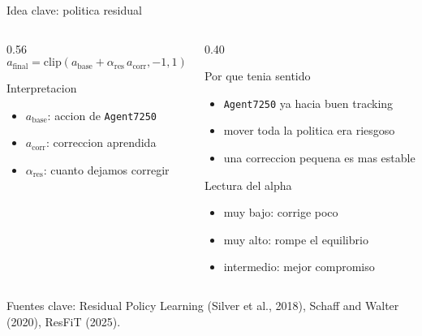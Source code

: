 \documentclass[aspectratio=169,11pt]{beamer}
\begin{document}
\begin{frame}{Idea clave: politica residual}
\begin{columns}[T]
\begin{column}{0.56\linewidth}
\[
a_{\mathrm{final}} = \mathrm{clip}\left(a_{\mathrm{base}} + \alpha_{\mathrm{res}}\, a_{\mathrm{corr}}, -1, 1\right)
\]

\begin{block}{Interpretacion}
\begin{itemize}
\item \(a_{\mathrm{base}}\): accion de \texttt{Agent7250}
\item \(a_{\mathrm{corr}}\): correccion aprendida
\item \(\alpha_{\mathrm{res}}\): cuanto dejamos corregir
\end{itemize}
\end{block}
\end{column}
\begin{column}{0.40\linewidth}
\begin{block}{Por que tenia sentido}
\begin{itemize}
\item \texttt{Agent7250} ya hacia buen tracking
\item mover toda la politica era riesgoso
\item una correccion pequena es mas estable
\end{itemize}
\end{block}

\begin{alertblock}{Lectura del alpha}
\begin{itemize}
\item muy bajo: corrige poco
\item muy alto: rompe el equilibrio
\item intermedio: mejor compromiso
\end{itemize}
\end{alertblock}
\end{column}
\end{columns}

\vspace{0.2cm}
\tiny Fuentes clave: Residual Policy Learning (Silver et al., 2018), Schaff and Walter (2020), ResFiT (2025).
\end{frame}
\end{document}
